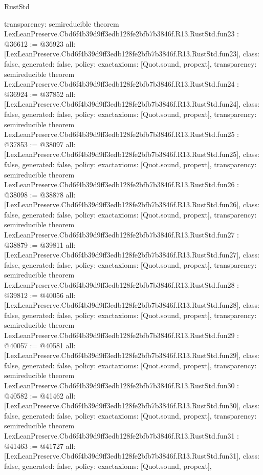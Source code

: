 \begin{lexlean}{RustStd}
\begin{coremodule}
{  transparency: semireducible
}
theorem LexLeanPreserve.Cbd6f4b39d9ff3edb128fe2bfb7b3846f.R13.RustStd.fun23 : @36612 := @36923 {
  all: [LexLeanPreserve.Cbd6f4b39d9ff3edb128fe2bfb7b3846f.R13.RustStd.fun23],
  class: false,
  generated: false,
  policy: exact{axioms: [Quot.sound, propext]},
  transparency: semireducible
}
theorem LexLeanPreserve.Cbd6f4b39d9ff3edb128fe2bfb7b3846f.R13.RustStd.fun24 : @36924 := @37852 {
  all: [LexLeanPreserve.Cbd6f4b39d9ff3edb128fe2bfb7b3846f.R13.RustStd.fun24],
  class: false,
  generated: false,
  policy: exact{axioms: [Quot.sound, propext]},
  transparency: semireducible
}
theorem LexLeanPreserve.Cbd6f4b39d9ff3edb128fe2bfb7b3846f.R13.RustStd.fun25 : @37853 := @38097 {
  all: [LexLeanPreserve.Cbd6f4b39d9ff3edb128fe2bfb7b3846f.R13.RustStd.fun25],
  class: false,
  generated: false,
  policy: exact{axioms: [Quot.sound, propext]},
  transparency: semireducible
}
theorem LexLeanPreserve.Cbd6f4b39d9ff3edb128fe2bfb7b3846f.R13.RustStd.fun26 : @38098 := @38878 {
  all: [LexLeanPreserve.Cbd6f4b39d9ff3edb128fe2bfb7b3846f.R13.RustStd.fun26],
  class: false,
  generated: false,
  policy: exact{axioms: [Quot.sound, propext]},
  transparency: semireducible
}
theorem LexLeanPreserve.Cbd6f4b39d9ff3edb128fe2bfb7b3846f.R13.RustStd.fun27 : @38879 := @39811 {
  all: [LexLeanPreserve.Cbd6f4b39d9ff3edb128fe2bfb7b3846f.R13.RustStd.fun27],
  class: false,
  generated: false,
  policy: exact{axioms: [Quot.sound, propext]},
  transparency: semireducible
}
theorem LexLeanPreserve.Cbd6f4b39d9ff3edb128fe2bfb7b3846f.R13.RustStd.fun28 : @39812 := @40056 {
  all: [LexLeanPreserve.Cbd6f4b39d9ff3edb128fe2bfb7b3846f.R13.RustStd.fun28],
  class: false,
  generated: false,
  policy: exact{axioms: [Quot.sound, propext]},
  transparency: semireducible
}
theorem LexLeanPreserve.Cbd6f4b39d9ff3edb128fe2bfb7b3846f.R13.RustStd.fun29 : @40057 := @40581 {
  all: [LexLeanPreserve.Cbd6f4b39d9ff3edb128fe2bfb7b3846f.R13.RustStd.fun29],
  class: false,
  generated: false,
  policy: exact{axioms: [Quot.sound, propext]},
  transparency: semireducible
}
theorem LexLeanPreserve.Cbd6f4b39d9ff3edb128fe2bfb7b3846f.R13.RustStd.fun30 : @40582 := @41462 {
  all: [LexLeanPreserve.Cbd6f4b39d9ff3edb128fe2bfb7b3846f.R13.RustStd.fun30],
  class: false,
  generated: false,
  policy: exact{axioms: [Quot.sound, propext]},
  transparency: semireducible
}
theorem LexLeanPreserve.Cbd6f4b39d9ff3edb128fe2bfb7b3846f.R13.RustStd.fun31 : @41463 := @41727 {
  all: [LexLeanPreserve.Cbd6f4b39d9ff3edb128fe2bfb7b3846f.R13.RustStd.fun31],
  class: false,
  generated: false,
  policy: exact{axioms: [Quot.sound, propext]},
}
\end{coremodule}
\end{lexlean}
